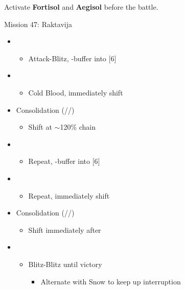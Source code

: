 \renewcommand{\third}{[3] Consolidation (\sen/\sen/\med)}

Activate \textbf{Fortisol} and \textbf{Aegisol} before the battle.

\begin{battle}{Mission 47: Raktavija}
	\begin{itemize}
		\item \first
			\begin{itemize}
				\item Attack-Blitz, \rav-buffer into [6]
			\end{itemize}
		\item \fifth
			\begin{itemize}
				\item Cold Blood, immediately shift
			\end{itemize}
		\item \third
			\begin{itemize}
				\item Shift at $\sim$120\% chain
			\end{itemize}
		\item \first
			\begin{itemize}
				\item Repeat, \rav-buffer into [6]
			\end{itemize}
		\item \fifth
			\begin{itemize}
				\item Repeat, immediately shift
			\end{itemize}	
		\item \third
			\begin{itemize}
				\item Shift immediately after \stagger
			\end{itemize}	
		\item \fourth
			\begin{itemize}
				\item Blitz-Blitz until victory
					\begin{itemize}
						\item Alternate with Snow to keep up interruption
					\end{itemize}
			\end{itemize}															
	\end{itemize}
\end{battle}
\vfill


